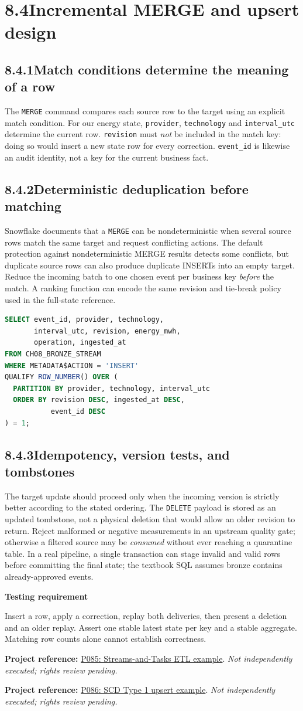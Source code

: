 \documentclass[11pt,twoside]{article}
\newcommand{\topic}[2]{\subsection*{#1\quad #2}}
\newcommand{\repo}[2]{\par\begingroup\fontsize{8.0}{9.6}\selectfont\sffamily\color{inkgray}\textbf{Project reference:} \href{#2}{#1}. \textit{Not independently executed; rights review pending.}\par\endgroup}
\begin{document}
\section*{8.4\quad Incremental MERGE and upsert design}
\topic{8.4.1}{Match conditions determine the meaning of a row}
The \texttt{MERGE} command compares each source row to the target using an explicit match condition. For our energy state, \texttt{provider}, \texttt{technology} and \texttt{interval\_utc} determine the current row. \texttt{revision} must \emph{not} be included in the match key: doing so would insert a new state row for every correction. \texttt{event\_id} is likewise an audit identity, not a key for the current business fact.
\topic{8.4.2}{Deterministic deduplication before matching}
Snowflake documents that a \texttt{MERGE} can be nondeterministic when several source rows match the same target and request conflicting actions. The default protection against nondeterministic MERGE results detects some conflicts, but duplicate source rows can also produce duplicate INSERTs into an empty target. Reduce the incoming batch to one chosen event per business key \emph{before} the match. A ranking function can encode the same revision and tie-break policy used in the full-state reference.
\begin{lstlisting}[language=SQL,caption={Core of the laboratory's deterministic source reduction.}]
SELECT event_id, provider, technology,
       interval_utc, revision, energy_mwh,
       operation, ingested_at
FROM CH08_BRONZE_STREAM
WHERE METADATA$ACTION = 'INSERT'
QUALIFY ROW_NUMBER() OVER (
  PARTITION BY provider, technology, interval_utc
  ORDER BY revision DESC, ingested_at DESC,
           event_id DESC
) = 1;
\end{lstlisting}
\topic{8.4.3}{Idempotency, version tests, and tombstones}
The target update should proceed only when the incoming version is strictly better according to the stated ordering. The \texttt{DELETE} payload is stored as an updated tombstone, not a physical deletion that would allow an older revision to return. Reject malformed or negative measurements in an upstream quality gate; otherwise a filtered source may be \emph{consumed} without ever reaching a quarantine table. In a real pipeline, a single transaction can stage invalid and valid rows before committing the final state; the textbook SQL assumes bronze contains already-approved events.
\begin{insight}\textbf{Testing requirement}\par
Insert a row, apply a correction, replay both deliveries, then present a deletion and an older replay. Assert one stable latest state per key and a stable aggregate. Matching row counts alone cannot establish correctness.\end{insight}
\repo{P085: Streams-and-Tasks ETL example}{https://github.com/subhamay-bhattacharyya/snowflake-streams-tasks-etl}
\repo{P086: SCD Type 1 upsert example}{https://github.com/Alan-Webb-1/snowflake-scd1-pipeline}
\newpage
\end{document}
